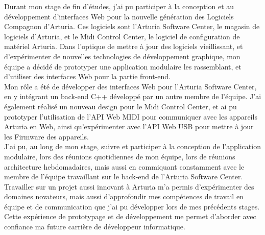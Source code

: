 \documentclass[francais]{rapportPFE}  %
\begin{document}
\begin{ResumeMotsCles}
\begin{resumeFr}
Durant mon stage de fin d'études, j'ai pu participer à la conception et au développement d'interfaces Web pour la nouvelle génération des Logiciels Compagnon d'Arturia. Ces logiciels sont l'Arturia Software Center, le magasin de logiciels d'Arturia, et le Midi Control Center, le logiciel de configuration de matériel Arturia. Dans l'optique de mettre à jour des logiciels vieillissant, et d'expérimenter de nouvelles technologies de développement graphique, mon équipe a décidé de prototyper une application modulaire les rassemblant, et d'utiliser des interfaces Web pour la partie front-end. \\%
Mon rôle a été de développer des interfaces Web pour l'Arturia Software Center, en y intégrant un back-end C++ développé par un autre membre de l'équipe. J'ai également réalisé un nouveau design pour le Midi Control Center, et ai pu prototyper l'utilisation de l'API Web MIDI pour communiquer avec les appareils Arturia en Web, ainsi qu'expérimenter avec l'API Web USB pour mettre à jour les Firmware des appareils.  \\
J'ai pu, au long de mon stage, suivre et participer à la conception de l'application modulaire, lors des réunions quotidiennes de mon équipe, lors de réunions architecture hebdomadaires, mais aussi en commiquant constamment avec le membre de l'équipe travaillant sur le back-end de l'Arturia Software Center.\\
Travailler sur un projet aussi innovant à Arturia m'a permis d'expérimenter des domaines novateurs, mais aussi d'approfondir mes compétences de travail en équipe et de communication que j'ai pu développer lors de mes précédents stages. Cette expérience de prototypage et de développement me permet d'aborder avec confiance ma future carrière de développeur informatique.
\end{resumeFr}

\end{ResumeMotsCles}


\end{document}

